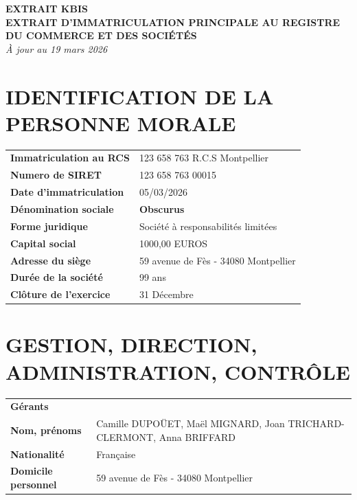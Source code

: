 \documentclass[10pt,a4paper]{article}
\begin{document}
\begin{center}
    \textbf{\huge EXTRAIT KBIS} \\
    \medskip
    \textbf{\small EXTRAIT D’IMMATRICULATION PRINCIPALE AU REGISTRE DU COMMERCE ET DES SOCIÉTÉS} \\
    \textit{À jour au 19 mars 2026}
\end{center}

\vspace{0.8cm}

\section*{IDENTIFICATION DE LA PERSONNE MORALE}
\begin{table}[h!]
\renewcommand{\arraystretch}{1.5}
\begin{tabularx}{\textwidth}{l X}
\textbf{Immatriculation au RCS} & 123 658 763 R.C.S Montpellier \\
\textbf{Numero de SIRET} & 123 658 763 00015 \\
\textbf{Date d’immatriculation} & 05/03/2026 \\
\textbf{Dénomination sociale} & \textbf{Obscurus} \\
\textbf{Forme juridique} & Société à responsabilités limitées \\
\textbf{Capital social} & 1000,00 EUROS \\
\textbf{Adresse du siège} & 59 avenue de Fès - 34080 Montpellier \\
\textbf{Durée de la société} & 99 ans \\
\textbf{Clôture de l'exercice} & 31 Décembre \\
\end{tabularx}
\end{table}

\section*{GESTION, DIRECTION, ADMINISTRATION, CONTRÔLE}
\begin{table}[h!]
\renewcommand{\arraystretch}{1.5}
\begin{tabularx}{\textwidth}{l X}
\textbf{Gérants} & \\
\textbf{Nom, prénoms} & Camille DUPOÜET, Maël MIGNARD, Joan TRICHARD-CLERMONT, Anna BRIFFARD \\
\textbf{Nationalité} & Française \\
\textbf{Domicile personnel} & 59 avenue de Fès - 34080 Montpellier \\
\end{tabularx}
\end{table}
\end{document}
